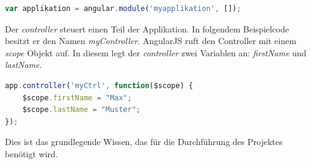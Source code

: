\begin{lstlisting}[language=JavaScript]	
	var applikation = angular.module('myapplikation', []);
\end{lstlisting}

Der \textit{controller} steuert einen Teil der Applikation. In folgendem Beispielcode besitzt er den Namen \textit{myController}. AngularJS ruft den Controller mit einem \textit{scope} Objekt auf. In diesem legt der \textit{controller} zwei Variablen an: \textit{firstName} und \textit{lastName}. 

\begin{lstlisting}[language=JavaScript]	
app.controller('myCtrl', function($scope) {
    $scope.firstName = "Max";
    $scope.lastName = "Muster";
});
\end{lstlisting}

Dies ist das grundlegende Wissen, das für die Durchführung des Projektes benötigt wird. 














